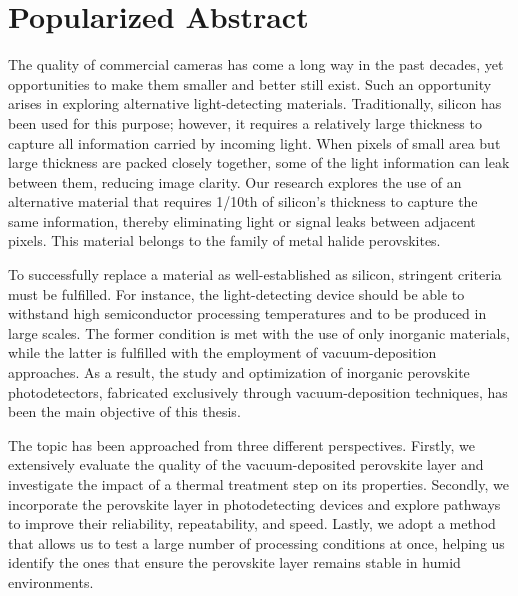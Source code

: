\chapter{Popularized Abstract}\label{ch:popabstract}

The quality of commercial cameras has come a long way in the past decades, yet opportunities to make them smaller and better still exist. Such an opportunity arises in exploring alternative light-detecting materials. Traditionally, silicon has been used for this purpose; however, it requires a relatively large thickness to capture all information carried by incoming light. When pixels of small area but large thickness are packed closely together, some of the light information can leak between them, reducing image clarity. Our research explores the use of an alternative material that requires 1/10th of silicon's thickness to capture the same information, thereby eliminating light or signal leaks between adjacent pixels. This material belongs to the family of metal halide perovskites. 

To successfully replace a material as well-established as silicon, stringent criteria must be fulfilled. For instance, the light-detecting device should be able to withstand high semiconductor processing temperatures and to be produced in large scales. The former condition is met with the use of only inorganic materials, while the latter is fulfilled with the employment of vacuum-deposition approaches. As a result, the study and optimization of inorganic perovskite photodetectors, fabricated exclusively through vacuum-deposition techniques, has been the main objective of this thesis. 

The topic has been approached from three different perspectives. Firstly, we extensively evaluate the quality of the vacuum-deposited perovskite layer and investigate the impact of a thermal treatment step on its properties. Secondly, we incorporate the perovskite layer in photodetecting devices and explore pathways to improve their reliability, repeatability, and speed. Lastly, we adopt a method that allows us to test a large number of processing conditions at once, helping us identify the ones that ensure the perovskite layer remains stable in humid environments.


\cleardoublepage
